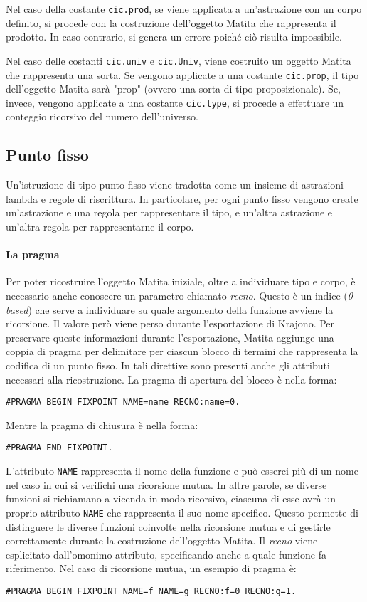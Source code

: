 \documentclass[12pt,a4paper]{mimosis}
\begin{document}
Nel caso della
costante \texttt{cic.prod}, se viene applicata a un'astrazione con un corpo definito,
si procede con la costruzione dell'oggetto Matita che rappresenta il prodotto. In caso
contrario, si genera un errore poiché ciò risulta impossibile.

Nel caso delle costanti \texttt{cic.univ} e \texttt{cic.Univ}, viene costruito un
oggetto Matita che rappresenta una sorta. Se vengono applicate a una costante
\texttt{cic.prop}, il tipo dell'oggetto Matita sarà "prop" (ovvero una sorta di
tipo proposizionale). Se, invece, vengono applicate a una costante \texttt{cic.type},
si procede a effettuare un conteggio ricorsivo del numero dell'universo.

\subsection{Punto fisso} 
Un'istruzione di tipo punto fisso viene tradotta come un insieme di astrazioni 
lambda e regole di riscrittura. In particolare, per ogni punto fisso vengono 
create un'astrazione e una regola per rappresentare il tipo, e un'altra astrazione
e un'altra regola per rappresentarne il corpo.


\paragraph{La pragma} Per poter ricostruire l'oggetto Matita iniziale, oltre
a individuare tipo e corpo, è necessario anche conoscere un parametro chiamato
\textit{recno}. Questo è un indice (\textit{0-based}) che serve a individuare
su quale argomento della funzione avviene la ricorsione. Il valore però viene
perso durante l'esportazione di Krajono.
Per preservare queste informazioni durante l'esportazione, Matita aggiunge 
una coppia di pragma per delimitare per ciascun blocco di termini che rappresenta 
la codifica di un punto fisso. In tali direttive sono presenti anche gli attributi
necessari alla ricostruzione. La pragma di apertura del blocco è nella forma:
\begin{center}
\texttt{\#PRAGMA BEGIN FIXPOINT NAME=name RECNO:name=0.}
\end{center}
Mentre la pragma di chiusura è nella forma:
\begin{center}
\texttt{\#PRAGMA END FIXPOINT.}
\end{center}

L'attributo \texttt{NAME} rappresenta il nome della funzione e può esserci più
di un nome nel caso in cui si verifichi una ricorsione mutua. In altre parole,
se diverse funzioni si richiamano a vicenda in modo ricorsivo, ciascuna di esse
avrà un proprio attributo \texttt{NAME} che rappresenta il suo nome specifico.
Questo permette di distinguere le diverse funzioni coinvolte nella ricorsione 
mutua e di gestirle correttamente durante la costruzione dell'oggetto Matita.
Il \textit{recno} viene esplicitato dall'omonimo attributo, specificando anche
a quale funzione fa riferimento. Nel caso di ricorsione mutua, un esempio di
pragma è:
\begin{center}
\texttt{\#PRAGMA BEGIN FIXPOINT NAME=f NAME=g RECNO:f=0 RECNO:g=1.}
\end{center}
\end{document}
